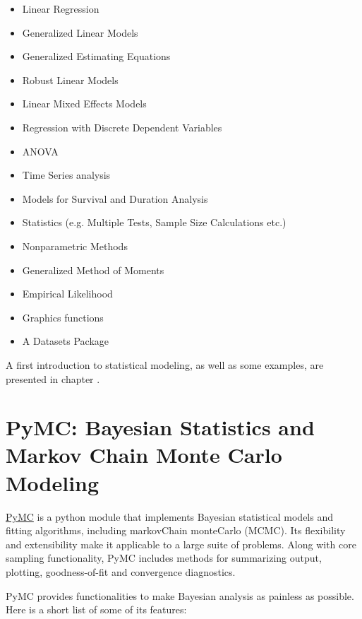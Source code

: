 \begin{itemize}
  \item   Linear Regression
  \item   Generalized Linear Models
  \item   Generalized Estimating Equations
  \item   Robust Linear Models
  \item   Linear Mixed Effects Models
  \item   Regression with Discrete Dependent Variables
  \item   ANOVA
  \item   Time Series analysis
  \item   Models for Survival and Duration Analysis
  \item   Statistics (e.g. Multiple Tests, Sample Size Calculations etc.)
  \item   Nonparametric Methods
  \item   Generalized Method of Moments
  \item   Empirical Likelihood
  \item  Graphics functions
  \item  A Datasets Package
\end{itemize}

A first introduction to statistical modeling, as well as some examples, are presented in chapter .

\section{PyMC: Bayesian Statistics and Markov Chain Monte Carlo Modeling}

\href{http://pymc-devs.github.io/pymc/}{PyMC} is a python module that implements Bayesian statistical models and fitting algorithms, including \gls{markovChain} \gls{monteCarlo} (MCMC). Its flexibility and extensibility make it applicable to a large suite of problems. Along with core sampling functionality, PyMC includes methods for summarizing output, plotting, goodness-of-fit and convergence diagnostics.

PyMC provides functionalities to make Bayesian analysis as painless as possible. Here is a short list of some of its features:

